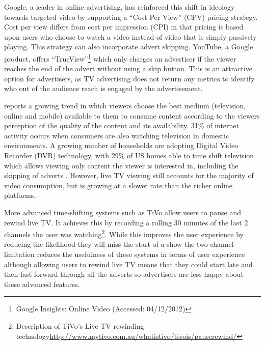 
	Google, a leader in online advertising, has reinforced this shift in ideology towards targeted video by supporting a ``Cost Per View'' (CPV) pricing strategy. Cost per view differs from cost per impression (CPI) in that pricing is based upon users who choose to watch a video instead of video that is simply passively playing. This strategy can also incorporate advert skipping. YouTube, a Google product, offers ``TrueView''\footnote{Google Insights: Online Video  (Accessed: 04/12/2012)} which only charges an advertiser if the viewer reaches the end of the advert without using a skip button. This is an attractive option for advertisers, as TV advertising does not return any metrics to identify who out of the audience reach is engaged by the advertisement.

	\citet{three-screen} reports a growing trend in which viewers choose the best medium (television, online and mobile) available to them to consume content according to the viewers perception of the quality of the content and its availability. 31\% of internet activity occurs when consumers are also watching television in domestic environments. A growing number of households are adopting Digital Video Recorder (DVR) technology, with 29\% of US homes able to time shift television which allows viewing only content the viewer is interested in, including the skipping of adverts \citep{gal2006targeted}. However, live TV viewing still accounts for the majority of video consumption, but is growing at a slower rate than the richer online platforms.

	More advanced time-shifting systems such as TiVo allow users to pause and rewind live TV. It achieves this by recording a rolling 30 minutes of the last 2 channels the user was watching\footnote{Description of TiVo's Live TV rewinding technology\url{http://www.mytivo.com.au/whatistivo/tivois/pauserewind/}}. While this improves the user experience by reducing the likelihood they will miss the start of a show the two channel limitation reduces the usefulness of these systems in terms of user experience although allowing users to rewind live TV means that they could start late and then fast forward through all the adverts so advertisers are less happy about these advanced features.

